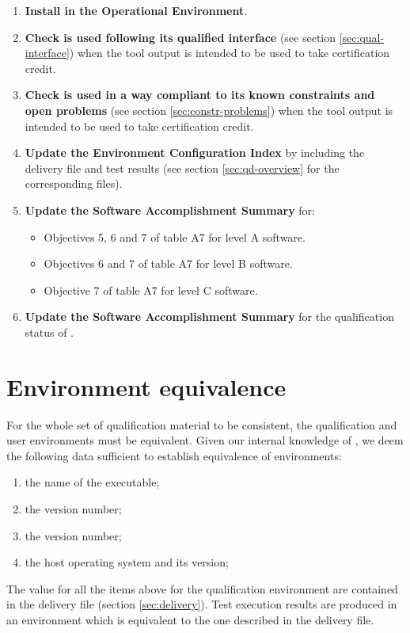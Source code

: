 \documentclass {report}
\begin{document}
\begin{enumerate}
\item%
  \textbf{Install \xcov{} in the Operational Environment}.
%
\item%
  \textbf{Check \xcov{} is used following its qualified interface} (see
  section \ref{sec:qual-interface}) when the tool output is intended to be
  used to take certification credit.
%
\item%
  \textbf{Check \xcov{} is used in a way compliant to its known constraints
    and open problems} (see section \ref{sec:constr-problems}) when the tool
  output is intended to be used to take certification credit.
%
\item%
  \textbf{Update the Environment Configuration Index} by including the
  delivery file and test results (see section \ref{sec:qd-overview} for the
  corresponding files).
%
\item%
  \textbf{Update the Software Accomplishment Summary} for:
  \begin{itemize}
  \item Objectives 5, 6 and 7 of table A7 for level A software.
  \item Objectives 6 and 7 of table A7 for level B software.
  \item Objective 7 of table A7 for level C software.
  \end{itemize}
%
\item%
  \textbf{Update the Software Accomplishment Summary} for the qualification
  status of \xcov{}.
\end{enumerate}

\section{Environment equivalence}
\label{sec:equivalence}

For the whole set of qualification material to be consistent, the
qualification and user environments must be equivalent.
%
Given our internal knowledge of \xcov{}, we deem the following data sufficient
to establish equivalence of environments:

\begin{enumerate}
\item the name of the \gnatp{} executable;
\item the \gnatp{} version number;
\item the \xcov{} version number;
\item the host operating system and its version;
\end{enumerate}

The value for all the items above for the qualification environment are
contained in the delivery file (section \ref{sec:delivery}). Test execution
results are produced in an environment which is equivalent to the one
described in the delivery file.
\end{document}
